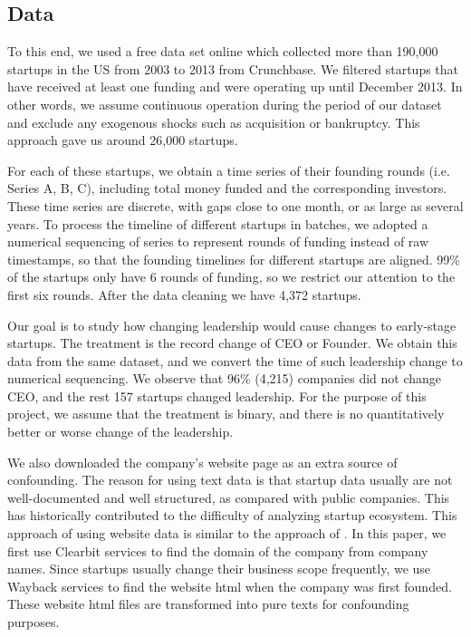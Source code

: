 \documentclass[12pt]{article}
\begin{document}
\subsection{Data}
To this end, we used a free data set online which collected more than 190,000 startups in the US from 2003 to 2013 from Crunchbase. We filtered startups that have received at least one funding and were operating up until December 2013. In other words, we assume continuous operation during the period of our dataset and exclude any exogenous shocks such as acquisition or bankruptcy. This approach gave us around 26,000 startups.

For each of these startups, we obtain a time series of their founding rounds (i.e. Series A, B, C), including total money funded and the corresponding investors. These time series are discrete, with gaps close to one month, or as large as several years. To process the timeline of different startups in batches, we adopted a numerical sequencing of series to represent rounds of funding instead of raw timestamps, so that the founding timelines for different startups are aligned. 99\% of the startups only have 6 rounds of funding, so we restrict our attention to the first six rounds. After the data cleaning we have 4,372 startups.

Our goal is to study how changing leadership would cause changes to early-stage startups. The treatment is the record change of CEO or Founder. We obtain this data from the same dataset, and we convert the time of such leadership change to numerical sequencing. We observe that 96\% (4,215) companies did not change CEO, and the rest 157 startups changed leadership. For the purpose of this project, we assume that the treatment is binary, and there is no quantitatively better or worse change of the leadership.

We also downloaded the company's website page as an extra source of confounding. The reason for using text data is that startup data usually are not well-documented and well structured, as compared with public companies. This has historically contributed to the difficulty of analyzing startup ecosystem. This approach of using website data is similar to the approach of \cite{jorge}. In this paper, we first use Clearbit services to find the domain of the company from company names. Since startups usually change their business scope frequently, we use Wayback services to find the website html when the company was first founded. These website html files are transformed into pure texts for confounding purposes.
\end{document}
